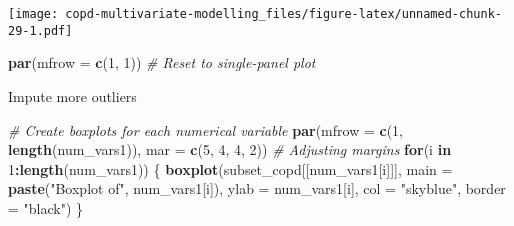 \documentclass[
]{article}
\newenvironment{Shaded}{\begin{snugshade}}{\end{snugshade}}
\newcommand{\AttributeTok}[1]{\textcolor[rgb]{0.13,0.29,0.53}{#1}}
\newcommand{\CommentTok}[1]{\textcolor[rgb]{0.56,0.35,0.01}{\textit{#1}}}
\newcommand{\ControlFlowTok}[1]{\textcolor[rgb]{0.13,0.29,0.53}{\textbf{#1}}}
\newcommand{\DecValTok}[1]{\textcolor[rgb]{0.00,0.00,0.81}{#1}}
\newcommand{\FunctionTok}[1]{\textcolor[rgb]{0.13,0.29,0.53}{\textbf{#1}}}
\newcommand{\NormalTok}[1]{#1}
\newcommand{\OtherTok}[1]{\textcolor[rgb]{0.56,0.35,0.01}{#1}}
\newcommand{\SpecialCharTok}[1]{\textcolor[rgb]{0.81,0.36,0.00}{\textbf{#1}}}
\newcommand{\StringTok}[1]{\textcolor[rgb]{0.31,0.60,0.02}{#1}}
\begin{document}
\texttt{[image: copd-multivariate-modelling\_files/figure-latex/unnamed-chunk-29-1.pdf]}

\begin{Shaded}
\begin{Highlighting}[]
\FunctionTok{par}\NormalTok{(}\AttributeTok{mfrow =} \FunctionTok{c}\NormalTok{(}\DecValTok{1}\NormalTok{, }\DecValTok{1}\NormalTok{))  }\CommentTok{\# Reset to single{-}panel plot}
\end{Highlighting}
\end{Shaded}

Impute more outliers

\begin{Shaded}
\end{Shaded}

\begin{Shaded}
\begin{Highlighting}[]
\CommentTok{\# Create boxplots for each numerical variable}
\FunctionTok{par}\NormalTok{(}\AttributeTok{mfrow =} \FunctionTok{c}\NormalTok{(}\DecValTok{1}\NormalTok{, }\FunctionTok{length}\NormalTok{(num\_vars1)), }\AttributeTok{mar =} \FunctionTok{c}\NormalTok{(}\DecValTok{5}\NormalTok{, }\DecValTok{4}\NormalTok{, }\DecValTok{4}\NormalTok{, }\DecValTok{2}\NormalTok{))  }\CommentTok{\# Adjusting margins}
\ControlFlowTok{for}\NormalTok{(i }\ControlFlowTok{in} \DecValTok{1}\SpecialCharTok{:}\FunctionTok{length}\NormalTok{(num\_vars1)) \{}
  \FunctionTok{boxplot}\NormalTok{(subset\_copd[[num\_vars1[i]]], }\AttributeTok{main =} \FunctionTok{paste}\NormalTok{(}\StringTok{"Boxplot of"}\NormalTok{, num\_vars1[i]), }
          \AttributeTok{ylab =}\NormalTok{ num\_vars1[i], }\AttributeTok{col =} \StringTok{"skyblue"}\NormalTok{, }\AttributeTok{border =} \StringTok{"black"}\NormalTok{)}
\NormalTok{\}}
\end{Highlighting}
\end{Shaded}
\end{document}
